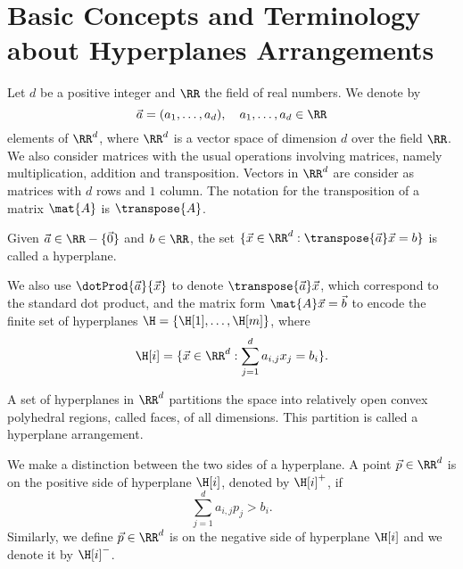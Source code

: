\section{Basic Concepts and Terminology about Hyperplanes Arrangements}
\label{sec:BasicConceptsHyperplanes}
Let $d$ be a positive integer and $\RR$ the field of real numbers. 
We denote by 
\begin{equation*}
\vec{a}=(a_1,\ldots,a_d),\quad a_1,\ldots, a_d\in\RR
\end{equation*}
 elements of $\RR^d$, where $\RR^d$ is 
a vector space of dimension $d$ over the field $\RR$.
We also consider matrices  with 
the usual operations involving matrices, namely
multiplication, addition and transposition. Vectors in $\RR^d$
are consider as matrices with $d$ rows and $1$ column. The notation for the
transposition of a matrix $\mat{A}$  is $\transpose{A}$.
\begin{definition}
  Given $\vec{a}\in\RR-\{\vec{0}\}$ and $b\in\RR$, the set 
  $\{\vec{x}\in\RR^d : \transpose{\vec{a}}\vec{x}=b\}$ is called a hyperplane.
\end{definition}
We also use $\dotProd{\vec{a}}{\vec{x}}$ to denote $\transpose{\vec{a}}\vec{x}$,
which correspond to the standard dot product, and 
the matrix form $\mat{A}\vec{x}=\vec{b}$ to encode 
the finite set of hyperplanes $\H=\{\H[1],\ldots, \H[m]\}$, where
\begin{equation}
  \label{eq:HyperplaneDefinition}
  \H[i]=\{\vec{x}\in\RR^{d}:\sum_{j=1}^{d}a_{i,j}x_j=b_i \}.
\end{equation}
\begin{definition}
  A set of hyperplanes in $\RR^d$ partitions the space into relatively
  open convex polyhedral regions, called faces, of all dimensions. This
partition is called a hyperplane arrangement.
\end{definition}
We make a distinction between the two sides of a hyperplane. A point
$\vec{p}\in\RR^{d}$ is on the positive side of hyperplane 
$\H[i]$, denoted by $\H[i]^{+}$, if 
\begin{equation*}
  \sum_{j=1}^{d}a_{i,j}p_{j}>b_i.
\end{equation*}
Similarly, we define $\vec{p}\in\RR^{d}$ is on the negative side of hyperplane $\H[i]$
and we denote it by $\H[i]^{-}$.

